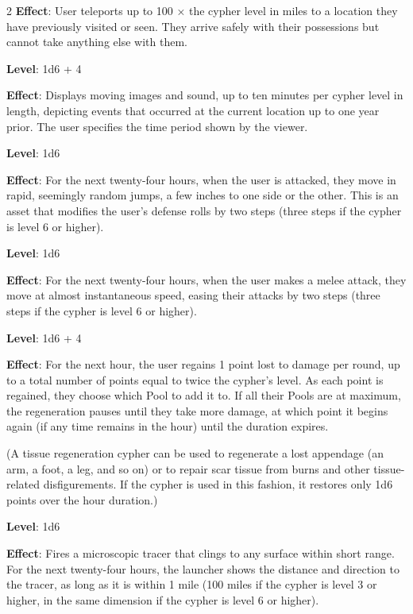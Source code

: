 \begin{multicols}{2}
\textbf{Effect}: User teleports up to 100 × the cypher level in miles to a location they have previously visited or seen. They arrive safely with their possessions but cannot take anything else with them.


\textbf{Level}: 1d6 + 4

\textbf{Effect}: Displays moving images and sound, up to ten minutes per cypher level in length, depicting events that occurred at the current location up to one year prior. The user specifies the time period shown by the viewer.


\textbf{Level}: 1d6

\textbf{Effect}: For the next twenty-four hours, when the user is attacked, they move in rapid, seemingly random jumps, a few inches to one side or the other. This is an asset that modifies the user’s defense rolls by two steps (three steps if the cypher is level 6 or higher).


\textbf{Level}: 1d6

\textbf{Effect}: For the next twenty-four hours, when the user makes a melee attack, they move at almost instantaneous speed, easing their attacks by two steps (three steps if the cypher is level 6 or higher).


\textbf{Level}: 1d6 + 4

\textbf{Effect}: For the next hour, the user regains 1 point lost to damage per round, up to a total number of points equal to twice the cypher’s level. As each point is regained, they choose which Pool to add it to. If all their Pools are at maximum, the regeneration pauses until they take more damage, at which point it begins again (if any time remains in the hour) until the duration expires.

(A tissue regeneration cypher can be used to regenerate a lost appendage (an arm, a foot, a leg, and so on) or to repair scar tissue from burns and other tissue-related disfigurements. If the cypher is used in this fashion, it restores only 1d6 points over the hour duration.)


\textbf{Level}: 1d6

\textbf{Effect}: Fires a microscopic tracer that clings to any surface within short range. For the next twenty-four hours, the launcher shows the distance and direction to the tracer, as long as it is within 1 mile (100 miles if the cypher is level 3 or higher, in the same dimension if the cypher is level 6 or higher).


\end{multicols}
